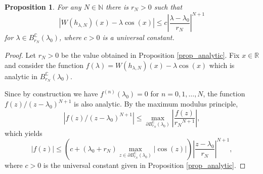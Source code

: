 \documentclass{amsart}
\def \R{\mathbb R}
\def \N{\mathbb N}
\def \C{\mathbb C}
\newtheorem{proposition}{Proposition}
\begin{document}
\begin{proposition}
	\label{prop_bound_error}
	For any $N \in \N$ there is $r_N > 0$ such that
	\[|W(h_{\lambda,N})(x) - \lambda \cos(x)| \leq c \left| \frac{\lambda - \lambda_0}{r_N} \right|^{N+1}\]
	for $\lambda \in B^\C_{r_N}({\lambda_0})$, where $c>0$ is a universal constant.
\end{proposition}
\begin{proof}
	Let $r_N>0$ be the value obtained in Proposition \ref{prop_analytic}.
	Fix $x \in \R$ and consider the function $f(\lambda) = W(h_{\lambda,N})(x) - \lambda \cos(x)$ which is analytic in $B^\C_{r_N}({\lambda_0})$.

	Since by construction we have $f^{(n)}(\lambda_0)=0$ for $n = 0,1, \ldots, N$, the function $f(z)/(z-\lambda_0)^{N+1}$ is also analytic.
	By the maximum modulus principle,
	\[|f(z)/(z-\lambda_0)^{N+1}| \leq \max_{\partial B^\C_{r_N}({\lambda_0})} \left|\frac{f(z)}{{r_N}^{N+1}}\right|,\]
	which yields
	\[|f(z)| \leq \left(c+(\lambda_0+r_N) \max_{z \in \partial B^\C_{r_N}(\lambda_0)} |\cos(z)| \right) \left|\frac{z-\lambda_0}{r_N}\right|^{N+1},\]
where $c>0$ is the universal constant given in Proposition \ref{prop_analytic}.
\end{proof}
\end{document}
